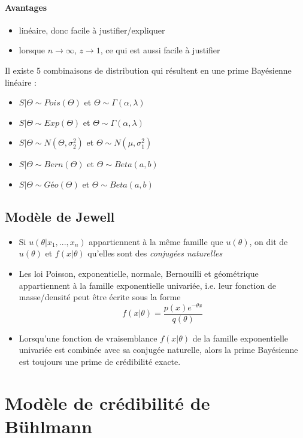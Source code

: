 \documentclass[10pt, french]{article}
\begin{document}
\begin{multicols*}{3}
\paragraph{Avantages}
\begin{itemize}
\item linéaire, donc facile à justifier/expliquer
\item lorsque $n \to \infty$, $z \to 1$, ce qui est aussi facile à justifier
\end{itemize}

Il existe 5 combinaisons de distribution qui résultent en une prime Bayésienne linéaire : 
\begin{itemize}
\item $S | \Theta \sim Pois(\Theta)$ et $\Theta \sim \Gamma(\alpha, \lambda)$
\item $S | \Theta \sim Exp(\Theta)$ et $\Theta \sim \Gamma(\alpha, \lambda)$
\item $S | \Theta \sim N(\Theta, \sigma_2^2)$ et $\Theta \sim N(\mu, \sigma_1^2)$
\item $S | \Theta \sim Bern(\Theta)$ et $\Theta \sim Beta(a,b)$
\item $S | \Theta \sim Géo(\Theta)$ et $\Theta \sim Beta(a,b)$
\end{itemize}

\subsection*{Modèle de Jewell}
\begin{itemize}
\item Si $u(\theta | x_1, ..., x_n)$ appartiennent à la même famille que $u(\theta)$, on dit de $u(\theta)$ et $f(x | \theta)$ qu'elles sont des \emph{conjugées naturelles}
\item Les loi Poisson, exponentielle, normale, Bernouilli et géométrique appartiennent à la famille exponentielle univariée, i.e. leur fonction de masse/densité peut être écrite sous la forme
\[f(x | \theta) =  \frac{p(x) e^{-\theta x}}{q(\theta)}   \]

\item Lorsqu'une fonction de vraisemblance $f(x|\theta)$ de la famille exponentielle univariée est combinée avec sa conjugée naturelle, alors la prime Bayésienne est toujours une prime de crédibilité exacte.
\end{itemize}


\columnbreak
\section{Modèle de crédibilité de \\ Bühlmann}

\end{multicols*}
\end{document}
